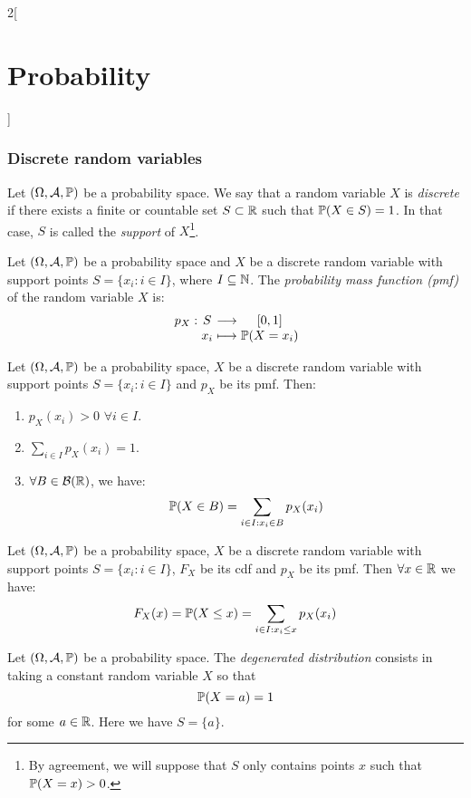 \documentclass[../../../main.tex]{subfiles}
\begin{document}
\begin{multicols}{2}[\section{Probability}]
    \subsubsection{Discrete random  variables}
    \begin{definition}
        Let $(\Omega,\mathcal{A},\mathbb{P})$ be a probability space. We say that a random variable $X$ is \textit{discrete} if there exists a finite or countable set $S\subset\mathbb{R}$ such that $\mathbb{P}(X\in S)=1$. In that case, $S$ is called the \textit{support} of $X$\footnote{By agreement, we will suppose that $S$ only contains points $x$ such that $\mathbb{P}(X=x)>0$.}.
    \end{definition}
    \begin{definition}
        Let $(\Omega,\mathcal{A},\mathbb{P})$ be a probability space and $X$ be a discrete random variable with support points $S=\{x_i:i\in I\}$, where $I\subseteq\mathbb{N}$. The \textit{probability mass function (pmf)} of the random variable $X$ is:
        $$
            \function{p_X}{S}{[0,1]}{x_i}{\Prob(X=x_i)}
        $$
    \end{definition}
    \begin{prop}
        Let $(\Omega,\mathcal{A},\mathbb{P})$ be a probability space, $X$ be a discrete random variable with support points $S=\{x_i:i\in I\}$ and $p_X$ be its pmf. Then:
        \begin{enumerate}
            \item $p_X(x_i)>0$ $\forall i\in I$.
            \item $\displaystyle\sum_{i\in I}p_X(x_i)=1$.
            \item $\forall B\in\mathcal{B}(\mathbb{R})$, we have: $$\mathbb{P}(X\in B)=\sum_{i\in I:x_i\in B}p_X(x_i)$$
        \end{enumerate}
    \end{prop}
    \begin{corollary}
        Let $(\Omega,\mathcal{A},\mathbb{P})$ be a probability space, $X$ be a discrete random variable with support points $S=\{x_i:i\in I\}$, $F_X$ be its cdf and $p_X$ be its pmf. Then $\forall x\in\mathbb{R}$ we have: $$F_X(x)=\mathbb{P}(X\leq x)=\sum_{i\in I:x_i\leq x}p_X(x_i)$$
    \end{corollary}
    \begin{definition}
        Let $(\Omega,\mathcal{A},\mathbb{P})$ be a probability space. The \textit{degenerated distribution} consists in taking a constant random variable $X$ so that $$\mathbb{P}(X=a)=1$$ for some $a\in\mathbb{R}$. Here we have $S=\{a\}$.

\end{definition}
\end{multicols}
\end{document}
